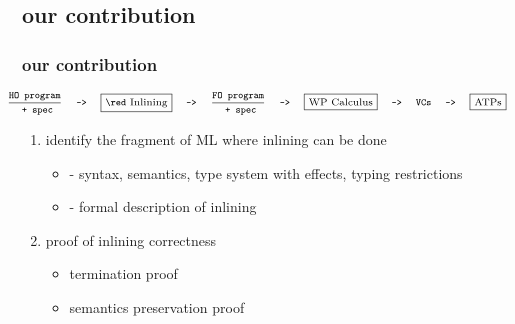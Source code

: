 
\subsection*{our contribution}
\begin{frame}[fragile]
\frametitle{our contribution}
\begin{displaymath}
\begin{scriptsize}
\begin{array}{@{\hspace*{-2.5em}}lllllllllll}
  \dfrac{\texttt{HO program}}{\texttt{ + spec}} & \texttt{->} 
& \fbox{\red Inlining}& \texttt{->} & \dfrac{\texttt{FO program}}{\texttt{ + spec}} & \texttt{->} 
& \fbox{WP Calculus} & \texttt{->} & \texttt{VCs} & \texttt{->} 
& \fbox{ATPs}
\end{array}
\end{scriptsize}
\end{displaymath}\pause
\begin{enumerate}
\item identify the fragment of ML where inlining can be done
\begin{itemize}
\item - syntax, semantics, type system with effects, typing restrictions
\item - formal description of inlining  \\[1em]
\end{itemize} \pause
\item proof of inlining correctness
\begin{itemize}	
\item termination proof
\item semantics preservation proof
\end{itemize}
\end{enumerate}
\end{frame}




